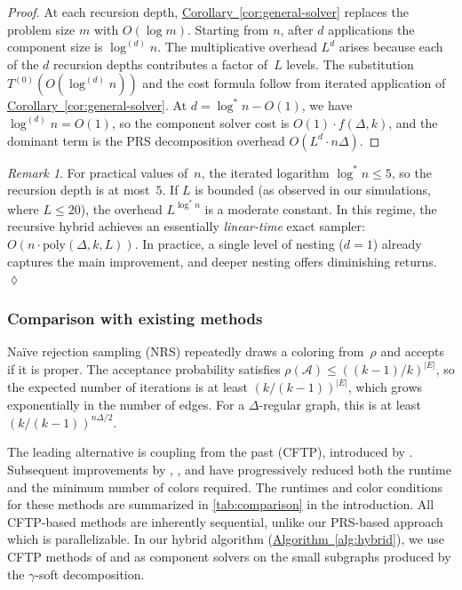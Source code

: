 \documentclass[12pt, a4paper]{article}
\theoremstyle{plain}
\theoremstyle{definition}
\theoremstyle{remark}
\newtheorem{remark}{Remark}
\newcommand{\mc}{\mathcal}
\newcommand{\sref}[2]{\hyperref[#2]{#1~\ref*{#2}}}
\begin{document}
\begin{proof}
At each recursion depth, \sref{Corollary}{cor:general-solver} replaces the problem size \(m\) with \(O(\log m)\). Starting from \(n\), after \(d\) applications the component size is \(\log^{(d)} n\). The multiplicative overhead \(L^d\) arises because each of the \(d\) recursion depths contributes a factor of~\(L\) levels. The substitution \(T^{(0)}(O(\log^{(d)} n))\) and the cost formula follow from iterated application of \sref{Corollary}{cor:general-solver}. At \(d = \log^* n - O(1)\), we have \(\log^{(d)} n = O(1)\), so the component solver cost is \(O(1)\cdot f(\Delta,k)\), and the dominant term is the PRS decomposition overhead \(O(L^d\cdot n\Delta)\).
\end{proof}

\begin{remark}\normalfont
For practical values of~\(n\), the iterated logarithm \(\log^* n\leq 5\), so the recursion depth is at most~\(5\). If \(L\) is bounded (as observed in our simulations, where \(L\leq 20\)), the overhead \(L^{\log^* n}\) is a moderate constant. In this regime, the recursive hybrid achieves an essentially {\em linear-time} exact sampler: \(O(n\cdot\mathrm{poly}(\Delta,k,L))\). In practice, a single level of nesting (\(d=1\)) already captures the main improvement, and deeper nesting offers diminishing returns.
\hfill\(\lozenge\)
\end{remark}

\subsubsection*{Comparison with existing methods}

Na\"{i}ve rejection sampling (NRS) repeatedly draws a coloring from~\(\rho\) and accepts if it is proper. The acceptance probability satisfies \(\rho(\mc A)\leq((k-1)/k)^{|E|}\), so the expected number of iterations is at least \((k/(k-1))^{|E|}\), which grows exponentially in the number of edges. For a \(\Delta\)-regular graph, this is at least \((k/(k-1))^{n\Delta/2}\).

The leading alternative is coupling from the past (CFTP), introduced by \cite{PW96}. Subsequent improvements by \cite{MH96}, \cite{BC20}, and \cite{JSS21} have progressively reduced both the runtime and the minimum number of colors required. The runtimes and color conditions for these methods are summarized in \autoref{tab:comparison} in the introduction. All CFTP-based methods are inherently sequential, unlike our PRS-based approach which is parallelizable. In our hybrid algorithm (\sref{Algorithm}{alg:hybrid}), we use CFTP methods of \cite{MH96} and \cite{BC20} as component solvers on the small subgraphs produced by the \(\gamma\)-soft decomposition.
\end{document}
